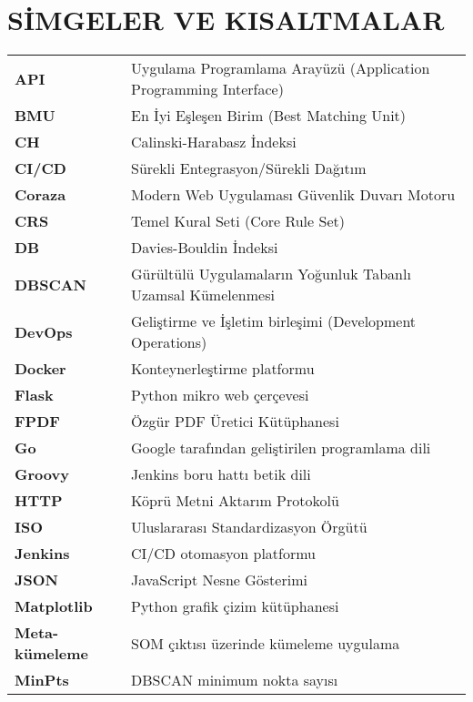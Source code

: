 \section*{SİMGELER VE KISALTMALAR}

\begin{spacing}{1.0}
\begin{longtable}{@{}p{} p{}@{}}
\textbf{API} & Uygulama Programlama Arayüzü (Application Programming Interface) \\[1ex]
\textbf{BMU}  &	En İyi Eşleşen Birim (Best Matching Unit) \\[1ex]
\textbf{CH} & Calinski-Harabasz İndeksi \\[1ex]
\textbf{CI/CD}  &	Sürekli Entegrasyon/Sürekli Dağıtım \\[1ex]
\textbf{Coraza} & Modern Web Uygulaması Güvenlik Duvarı Motoru \\[1ex]
\textbf{CRS}  &	Temel Kural Seti (Core Rule Set) \\[1ex]
\textbf{DB} & Davies-Bouldin İndeksi \\[1ex]
\textbf{DBSCAN}  &	Gürültülü Uygulamaların Yoğunluk Tabanlı Uzamsal Kümelenmesi \\[1ex]
\textbf{DevOps} & Geliştirme ve İşletim birleşimi (Development Operations) \\[1ex]
\textbf{Docker} & Konteynerleştirme platformu \\[1ex]
\textbf{Flask} & Python mikro web çerçevesi \\[1ex]
\textbf{FPDF}  &	Özgür PDF Üretici Kütüphanesi \\[1ex]
\textbf{Go} & Google tarafından geliştirilen programlama dili \\[1ex]
\textbf{Groovy} & Jenkins boru hattı betik dili \\[1ex]
\textbf{HTTP}  &	Köprü Metni Aktarım Protokolü \\[1ex]
\textbf{ISO} & Uluslararası Standardizasyon Örgütü \\[1ex]
\textbf{Jenkins} & CI/CD otomasyon platformu \\[1ex]
\textbf{JSON}  &	JavaScript Nesne Gösterimi \\[1ex]
\textbf{Matplotlib} & Python grafik çizim kütüphanesi \\[1ex]
\textbf{Meta-kümeleme} & SOM çıktısı üzerinde kümeleme uygulama \\[1ex]
\textbf{MinPts} & DBSCAN minimum nokta sayısı \\[1ex]

\end{longtable}
\end{spacing}
